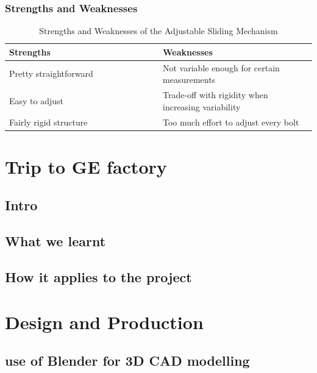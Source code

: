 \documentclass[a4paper,10pt]{article}
\begin{document}
\subsubsection{Strengths and Weaknesses}

\begin{table}[h]
  \centering
  \begin{tabular}{p{0.5\linewidth} | p{0.5\linewidth}}
    Strengths                                              & Weaknesses \\ \hline
    \textbullet{} Pretty straightforward                   & \textbullet{} Not variable enough for certain measurements \\
    \textbullet{} Easy to adjust                           & \textbullet{} Trade-off with rigidity when increasing variability \\
    \textbullet{} Fairly rigid structure                   & \textbullet{} Too much effort to adjust every bolt \\
  \end{tabular}
  \caption{Strengths and Weaknesses of the Adjustable Sliding Mechanism}
  \label{table:adjustable-block-pros-cons}
\end{table}

\section{Trip to GE factory}

\subsection{Intro}

\subsection{What we learnt}

\subsection{How it applies to the project}

\section{Design and Production}

\subsection{use of Blender for 3D CAD modelling}
\end{document}
